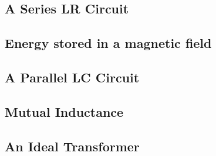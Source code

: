\documentclass[twocolumn]{article}
\begin{document}
\subsection{A Series LR Circuit}
\begin{outline}
	\1 
\end{outline}
\subsection{Energy stored in a magnetic field}
\begin{outline}
	\1 
\end{outline}
\subsection{A Parallel LC Circuit}
\begin{outline}
	\1 
\end{outline}
\subsection{Mutual Inductance}
\begin{outline}
	\1 
\end{outline}
\subsection{An Ideal Transformer}
\begin{outline}
	\1 
\end{outline}
\end{document}
